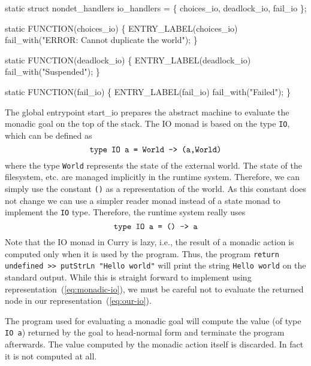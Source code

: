 \nwenddocs{}\nwdocspar
\nwenddocs{}\plusendmoddef\nwstartdeflinemarkup{}\nwenddeflinemarkup
static struct nondet_handlers io_handlers = \{
    choices_io, deadlock_io, fail_io
\};

static
FUNCTION(choices_io)
\{
 ENTRY_LABEL(choices_io)
    fail_with("ERROR: Cannot duplicate the world");
\}

static
FUNCTION(deadlock_io)
\{
 ENTRY_LABEL(deadlock_io)
    fail_with("Suspended");
\}

static
FUNCTION(fail_io)
\{
 ENTRY_LABEL(fail_io)
    fail_with("Failed");
\}

\nwendcode{}\nwdocspar
The global entrypoint {\Tt{}start{\_}io\nwendquote} prepares the abstract machine to
evaluate the monadic goal on the top of the stack. The IO monad is
based on the type \texttt{IO}, which can be defined as
\begin{equation}
  \mbox{\texttt{type IO a = World -> (a,World)}}\label{eq:monadic-io}
\end{equation}
where the type \texttt{World} represents the state of the external
world. The state of the filesystem, etc. are managed implicitly in the
runtime system. Therefore, we can simply use the constant \texttt{()}
as a representation of the world. As this constant does not change we
can use a simpler reader monad instead of a state monad to implement
the \texttt{IO} type. Therefore, the runtime system really uses
\begin{equation}
  \mbox{\texttt{type IO a = () -> a}}\label{eq:our-io}
\end{equation}
Note that the IO monad in Curry is lazy, i.e., the result of a monadic
action is computed only when it is used by the program. Thus, the
program \verb|return undefined >> putStrLn "Hello world"| will print
the string \verb|Hello world| on the standard output. While this is
straight forward to implement using
representation~(\ref{eq:monadic-io}), we must be careful not to
evaluate the returned node in our representation~(\ref{eq:our-io}).

The program used for evaluating a monadic goal will compute the value
(of type \texttt{IO a}) returned by the goal to head-normal form and
terminate the program afterwards. The value computed by the monadic
action itself is discarded. In fact it is not computed at all.

